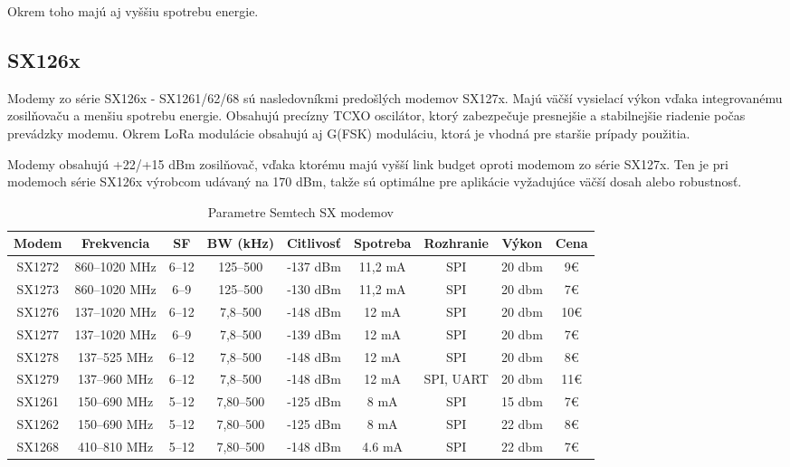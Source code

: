 \documentclass[slovak,master]{diploma}
\begin{document}
Okrem toho majú aj vyššiu spotrebu energie.

\subsection{SX126x}

Modemy zo série SX126x - SX1261/62/68 sú nasledovníkmi predošlých modemov SX127x. Majú väčší vysielací výkon vďaka integrovanému zosilňovaču a menšiu spotrebu energie. 
Obsahujú precízny TCXO oscilátor, ktorý zabezpečuje presnejšie a stabilnejšie riadenie počas prevádzky modemu. Okrem LoRa modulácie obsahujú aj G(FSK) moduláciu, ktorá je vhodná pre staršie 
prípady použitia.

Modemy obsahujú +22/+15 dBm zosilňovač, vďaka ktorému majú vyšší link budget oproti modemom zo série SX127x. 
Ten je pri modemoch série SX126x výrobcom udávaný na 170 dBm, takže sú optimálne pre aplikácie vyžadujúce väčší dosah alebo robustnosť.

\begin{table}[!h]
	\centering
  \small
  \setlength\tabcolsep{4pt}
	\caption[Parametre Semtech SX modemov]{Parametre Semtech SX modemov}
  \begin{tabular}{c|c|c|c|c|c|c|c|c}
    \toprule
    Modem & Frekvencia & SF & BW (kHz) & Citlivosť & Spotreba \footnotemark[1] & Rozhranie & Výkon\footnotemark[2] & Cena\footnotemark[3]\\
    \midrule
    SX1272 & 860--1020 MHz & 6--12 & 125--500 & -137 dBm & 11,2 mA & SPI & 20 dbm & 9€ \\
    SX1273 & 860--1020 MHz & 6--9 & 125--500 & -130 dBm & 11,2 mA & SPI & 20 dbm & 7€ \\
    SX1276 & 137--1020 MHz & 6--12 & 7,8--500 & -148 dBm & 12 mA & SPI & 20 dbm & 10€ \\
    SX1277 & 137--1020 MHz & 6--9 & 7,8--500 & -139 dBm & 12 mA & SPI & 20 dbm & 7€ \\
    SX1278 & 137--525 MHz & 6--12 & 7,8--500 & -148 dBm & 12 mA & SPI & 20 dbm & 8€ \\
    SX1279 & 137--960 MHz & 6--12 & 7,8--500 & -148 dBm & 12 mA & SPI, UART & 20 dbm & 11€ \\
    \hline
    SX1261 & 150--690 MHz & 5--12 & 7,80--500 & -125 dBm & 8 mA & SPI & 15 dbm & 7€ \\
    SX1262 & 150--690 MHz & 5--12 & 7,80--500 & -125 dBm & 8 mA & SPI & 22 dbm & 8€ \\
    SX1268 & 410--810 MHz & 5--12 & 7,80--500 & -148 dBm & 4.6 mA & SPI & 22 dbm & 7€ \\
    \midrule
  \end{tabular}
  \label{tab:semtechModules}
\end{table}
\end{document}
